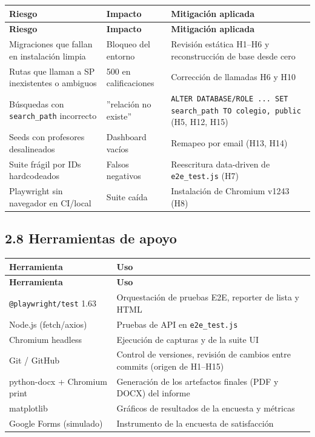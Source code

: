\documentclass[11pt,a4paper]{article}
\begin{document}
{\small
\begin{longtable}{|p{}|p{}|p{}|}
\rowcolor{UTECblue}\color{white}\bfseries Riesgo & \color{white}\bfseries Impacto & \color{white}\bfseries Mitigación aplicada \\ \hline
\endfirsthead
\rowcolor{UTECblue}\color{white}\bfseries Riesgo & \color{white}\bfseries Impacto & \color{white}\bfseries Mitigación aplicada \\ \hline
\endhead
Migraciones que fallan en instalación limpia & Bloqueo del entorno & Revisión estática H1--H6 y reconstrucción de base desde cero \\ \hline
Rutas que llaman a SP inexistentes o ambiguos & 500 en calificaciones & Corrección de llamadas H6 y H10 \\ \hline
Búsquedas con \texttt{search\_path} incorrecto & ''relación no existe'' & \texttt{ALTER DATABASE/ROLE ... SET search\_path TO colegio, public} (H5, H12, H15) \\ \hline
Seeds con profesores desalineados & Dashboard vacíos & Remapeo por email (H13, H14) \\ \hline
Suite frágil por IDs hardcodeados & Falsos negativos & Reescritura data-driven de \texttt{e2e\_test.js} (H7) \\ \hline
Playwright sin navegador en CI/local & Suite caída & Instalación de Chromium v1243 (H8) \\ \hline
\end{longtable}}


\subsection*{2.8 Herramientas de apoyo}


{\small
\begin{longtable}{|p{}|p{}|}
\rowcolor{UTECblue}\color{white}\bfseries Herramienta & \color{white}\bfseries Uso \\ \hline
\endfirsthead
\rowcolor{UTECblue}\color{white}\bfseries Herramienta & \color{white}\bfseries Uso \\ \hline
\endhead
\texttt{@playwright/test} 1.63 & Orquestación de pruebas E2E, reporter de lista y HTML \\ \hline
Node.js (fetch/axios) & Pruebas de API en \texttt{e2e\_test.js} \\ \hline
Chromium headless & Ejecución de capturas y de la suite UI \\ \hline
Git / GitHub & Control de versiones, revisión de cambios entre commits (origen de H1--H15) \\ \hline
python-docx + Chromium print & Generación de los artefactos finales (PDF y DOCX) del informe \\ \hline
matplotlib & Gráficos de resultados de la encuesta y métricas \\ \hline
Google Forms (simulado) & Instrumento de la encuesta de satisfacción \\ \hline
\end{longtable}}
\end{document}
